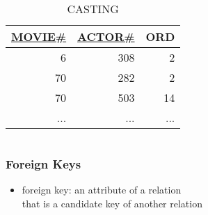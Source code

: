 \documentclass[dvipsnames]{beamer}
\theoremstyle{plain}
\begin{document}
\begin{frame}
\begin{columns}[t]
    \begin{footnotesize}
    \begin{table}
      \caption{CASTING}
      \begin{tabular}{|r|r|r|}\hline
\underline{MOVIE\#} & \underline{ACTOR\#} & ORD\\[2pt]\hline\hline
                  6 &                 308 &   2\\\hline
                 70 &                 282 &   2\\\hline
                 70 &                 503 &  14\\\hline
                ... &                 ... & ...\\\hline
      \end{tabular}
    \end{table}
    \end{footnotesize}
  \end{columns}
\end{frame}

\begin{frame}
  \frametitle{Foreign Keys}

  \begin{itemize}
    \item \alert{foreign key}: an attribute of a relation\\
      that is a candidate key of another relation
  \end{itemize}
\end{frame}
\end{document}
